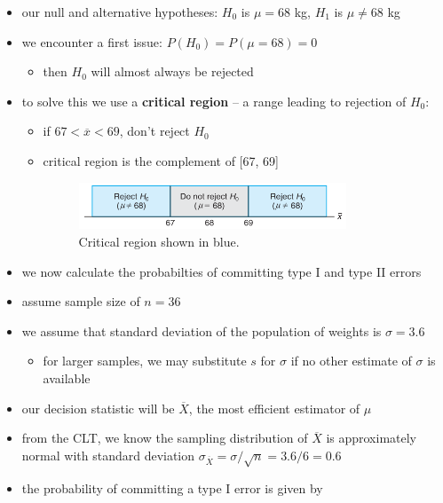 \documentclass[10pt]{article}
\begin{document}
\begin{itemize}
    \item our null and alternative hypotheses: $H_0$ is $\mu = 68$ kg, $H_1$ is $\mu \neq 68$ kg
    \item we encounter a first issue: $P(H_0) = P(\mu = 68) = 0$ 
        \begin{itemize}
            \item then $H_0$ will almost always be rejected
        \end{itemize}
    \item to solve this we use a \textbf{critical region} -- a range leading to rejection of $H_0$:
        \begin{itemize}
            \item if $67 < \overline{x} < 69$, don't reject $H_0$
            \item critical region is the complement of [67, 69]
                \begin{figure}[H]
                    \centering
                    \includegraphics[width=0.8\textwidth]{criticalRegion}
                    \caption{Critical region shown in blue.}
                    \label{fig:criticalRegion}
                \end{figure}
        \end{itemize}
    \item we now calculate the probabilties of committing type I and type II errors
    \item assume sample size of $n=36$
    \item we assume that standard deviation of the population of weights is $\sigma = 3.6$
         \begin{itemize}
            \item for larger samples, we may substitute $s$ for $\sigma$ if no other estimate of $\sigma$ is available
        \end{itemize}
    \item our decision statistic will be $\overline{X}$, the most efficient estimator of $\mu$ 
    \item from the CLT, we know the sampling distribution of $\overline{X}$ is approximately normal with standard deviation $\sigma_{\overline{X}} = \sigma / \sqrt{n} = 3.6 / 6 = 0.6$
    \item the probability of committing a type I error is given by 

\end{itemize}
\end{document}
